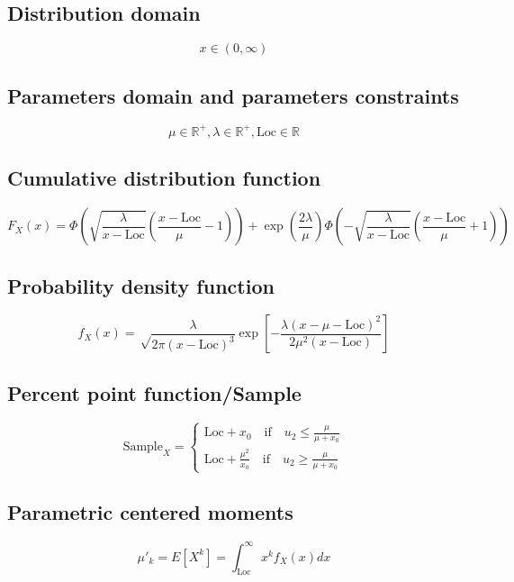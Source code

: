\documentclass{article}
\begin{document}
\subsection{Distribution domain}
\begin{equation*} x\in\left(0,\infty\right) \end{equation*}
\subsection{Parameters domain and parameters constraints}
\begin{equation*} \mu\in\mathbb{R}^{+}, \lambda\in\mathbb{R}^{+}, \text{Loc}\in\mathbb{R} \end{equation*}
\subsection{Cumulative distribution function}
\begin{equation*} F_{X}\left(x\right)=\Phi\left(\sqrt{\frac{\lambda}{x-\text{Loc}}}\left(\frac{x-\text{Loc}}{\mu}-1\right)\right)+\exp\left(\frac{2 \lambda}{\mu}\right) \Phi\left(-\sqrt{\frac{\lambda}{x-\text{Loc}}}\left(\frac{x-\text{Loc}}{\mu}+1\right)\right) \end{equation*}
\subsection{Probability density function}
\begin{equation*} f_{X}\left(x\right)=\sqrt\frac{\lambda}{2 \pi (x-\text{Loc})^3} \exp\left[-\frac{\lambda (x-\mu-\text{Loc})^2}{2 \mu^2 (x-\text{Loc})}\right] \end{equation*}
\subsection{Percent point function/Sample}
\begin{equation*} \text{Sample}_{X}=\left\{\begin{array}{cl} \text{Loc}+x_{0} \quad \text{if} \quad u_{2}\leqslant\frac{\mu}{\mu+x_{0}}\\ \text{Loc}+\frac{\mu^{2}}{x_{0}} \quad \text{if} \quad u_{2}\geqslant \frac{\mu}{\mu+x_{0}} \end{array} \right. \end{equation*}
\subsection{Parametric centered moments}
\begin{equation*} \mu'_{k}=E[X^k]=\int_{\text{Loc}}^{\infty }x^{k}f_{X}\left(x\right)dx \end{equation*}
\end{document}
